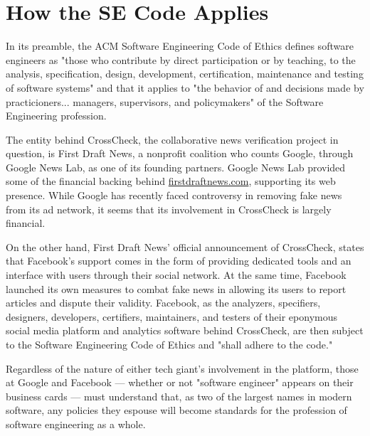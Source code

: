 
\section{How the SE Code Applies}

\par In its preamble, the ACM Software Engineering Code of Ethics defines software engineers as "those who contribute by direct participation or by teaching, to the analysis, specification, design, development, certification, maintenance and testing of software systems" and that it applies to "the behavior of and decisions made by practicioners... managers, supervisors, and policymakers" of the Software Engineering profession. \cite{se_code}

\par The entity behind CrossCheck, the collaborative news verification project in question, is First Draft News, a nonprofit coalition who counts Google, through Google News Lab, as one of its founding partners. Google News Lab provided some of the financial backing behind \url{firstdraftnews.com}, supporting its web presence. \cite{firstdraftnews_about} While Google has recently faced controversy in removing fake news from its ad network, \cite{tc_google_took_down_ads} it seems that its involvement in CrossCheck is largely financial.

\par On the other hand, First Draft News' official announcement of CrossCheck, states that Facebook's support comes in the form of providing dedicated tools and an interface with users through their social network. \cite{crosscheck_launch} At the same time, Facebook launched its own measures to combat fake news in allowing its users to report articles and dispute their validity. \cite{tc_google_fb_partner} Facebook, as the analyzers, specifiers, designers, developers, certifiers, maintainers, and testers of their eponymous social media platform and analytics software behind CrossCheck, are then subject to the Software Engineering Code of Ethics and "shall adhere to the code." \cite{se_code}

\par Regardless of the nature of either tech giant's involvement in the platform, those at Google and Facebook --- whether or not "software engineer" appears on their business cards --- must understand that, as two of the largest names in modern software, any policies they espouse will become standards for the profession of software engineering as a whole.
